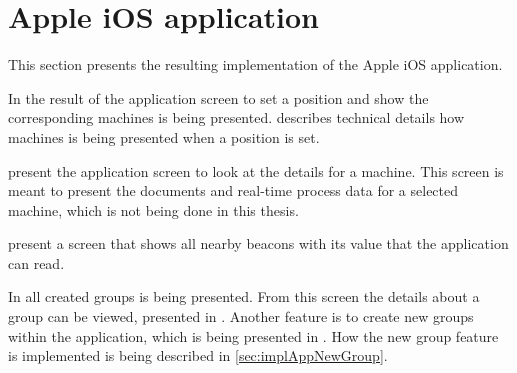\section{Apple iOS application}\label{sec:resultApp}
This section presents the resulting implementation of the Apple iOS application.

\bigskip

In  the result of the application screen to set a position and show the corresponding machines is being presented.
 describes technical details how machines is being presented when a position is set.

\bigskip

 present the application screen to look at the details for a machine.
This screen is meant to present the documents and real-time process data for a selected machine, which is not being done in this thesis. 

\bigskip

 present a screen that shows all nearby beacons with its value that the application can read.

\bigskip

In  all created groups is being presented.
From this screen the details about a group can be viewed, presented in .
Another feature is to create new groups within the application, which is being presented in .
How the new group feature is implemented is being described in \cref{sec:implAppNewGroup}.

